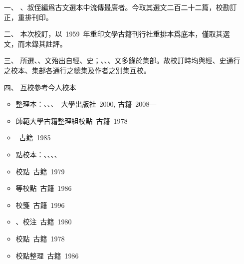 \begin{enumerate}
    \item[一、] 、叔侄編爲古文選本中流傳最廣者。今取其選文二百二十二篇，校勘訂正，重排刊印。
    \item[二、] 本次校訂，以\ 1959\ 年重印文學古籍刊行社重排本爲底本，僅取其選文，而未錄其註評。
    \item[三、] 所選、、文殆出自經、史；、、、文多錄於集部。故校訂時均與經、史通行之校本、集部各通行之總集及作者之別集互校。
    \item[四、] 互校參考今人校本
    \begin{itemize}
        \item {}整理本：、、、\ {\small {}大學出版社\ 2000, 古籍\ 2008—}
        \item {}師範大學古籍整理組校點\ {\small {}古籍\ 1978}
        \item {}\ {\small {}古籍\ 1985}
        \item {}點校本：、、、、
        \item {}校點\ {\small {}古籍\ 1979}
        \item {}等校點\ {\small {}古籍\ 1986}
        \item {}校箋\ {\small {}古籍\ 1996}
        \item {}、校注\ {\small {}古籍\ 1980}
        \item {}校點\ {\small {}古籍\ 1978}
        \item {}校點整理\ {\small {}古籍\ 1986}

\end{itemize}
\end{enumerate}
